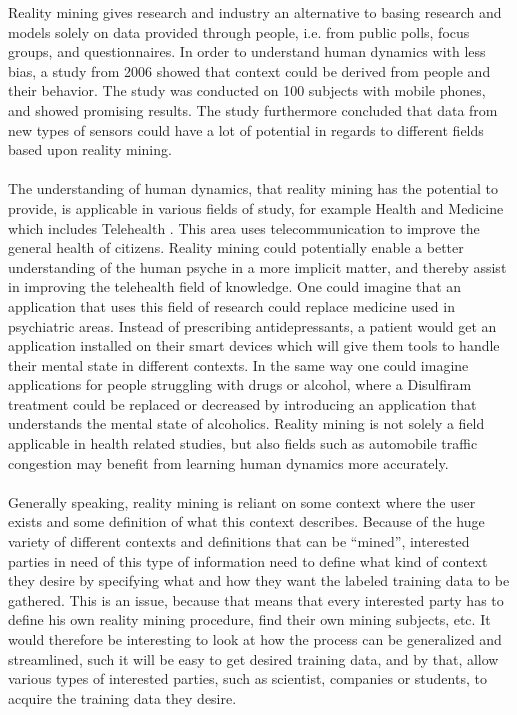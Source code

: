 Reality mining gives research and industry an alternative to basing research and models solely on data provided through people, i.e. from public polls, focus groups, and questionnaires. In order to understand human dynamics with less bias, a study from 2006 \parencite{eagle2006_reality_mining_definition} showed that context could be derived from people and their behavior. The study was conducted on 100 subjects with mobile phones, and showed promising results. The study furthermore concluded that data from new types of sensors could have a lot of potential in regards to different fields based upon reality mining. 
\\\\
The understanding of human dynamics, that reality mining has the potential to provide, is applicable in various fields of study, for example Health and Medicine \parencite{pentland2009_reality_mining_health_medicine} which includes Telehealth \parencite{telehealth_aau}. This area uses telecommunication to improve the general health of citizens. Reality mining could potentially enable a better understanding of the human psyche in a more implicit matter, and thereby assist in improving the telehealth field of knowledge. One could imagine that an application that uses this field of research could replace medicine used in psychiatric areas. Instead of prescribing antidepressants, a patient would get an application installed on their smart devices which will give them tools to handle their mental state in different contexts. In the same way one could imagine applications for people struggling with drugs or alcohol, where a Disulfiram \parencite{nlm_disulfiram} treatment could be replaced or decreased by introducing an application that understands the mental state of alcoholics. Reality mining is not solely a field applicable in health related studies, but also fields such as automobile traffic congestion \parencite{pentland2009reality_mining_mobile_communication_gps} may benefit from learning human dynamics more accurately.
\\\\
Generally speaking, reality mining is reliant on some context where the user exists and some definition of what this context describes. Because of the huge variety of different contexts and definitions that can be ``mined'', interested parties in need of this type of information need to define what kind of context they desire by specifying what and how they want the labeled training data to be gathered. This is an issue, because that means that every interested party has to define his own reality mining procedure, find their own mining subjects, etc. It would therefore be interesting to look at how the process can be generalized and streamlined, such it will be easy to get desired training data, and by that, allow various types of interested parties, such as scientist, companies or students, to acquire the training data they desire.
